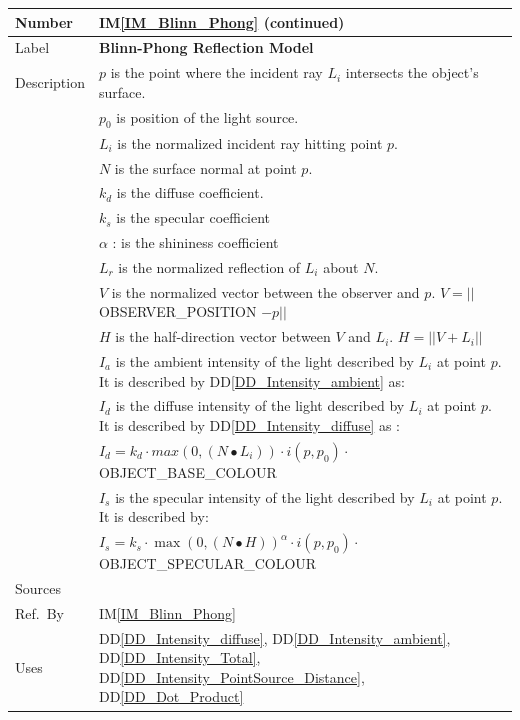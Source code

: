 \documentclass[12pt]{article}
\newcommand{\colAwidth}{0.13\textwidth}
\newcommand{\colBwidth}{0.82\textwidth}
\newcommand{\ddref}[1]{DD\ref{#1}}
\newcommand{\iref}[1]{IM\ref{#1}}
\begin{document}
\begin{minipage}{\textwidth}
	\renewcommand*{\arraystretch}{1.5}
	\begin{tabular}{| p{\colAwidth} | p{\colBwidth}|}
		\hline
		\rowcolor[gray]{0.9}
		Number& \iref{IM_Blinn_Phong} (continued)\\
		\hline
		Label& \bf Blinn-Phong Reflection Model\\
		\hline
		Description & $p$ is the point where the incident ray $L_{i}$ 
		intersects the 	object's surface.\\
		& $p_{0}$ is position of the light source. \\				
		& $L_{i}$ is the normalized incident ray hitting point $p$.\\
		& $N$ is the surface normal at point $p$.\\
		& $k_{d}$ is the diffuse coefficient.\\
		& $k_{s}$ is the specular coefficient\\
		& $\alpha$ : is the shininess coefficient\\		
		& $L_{r}$ is the normalized reflection of $L_{i}$ about $N$.\\
		& $V$ is the normalized vector between the observer and $p$. $V = 
		||$OBSERVER\_POSITION $- p||$\\
		& $H$ is the half-direction vector between $V$ and $L_{i}$. $H = 
		||V+L_{i}||$\\		
		& $I_{a}$ is the ambient intensity of the light described by 
		$L_{i}$ at point $p$. It is described by 
		\ddref{DD_Intensity_ambient} as:\\
		& $I_{d}$ is the diffuse intensity of the light described by 
		$L_{i}$ at point $p$. It is described by 
		\ddref{DD_Intensity_diffuse} as : \\
		& $I_{d} = k_{d}\cdot max(0, (N \bullet 
		L_{i}))\cdot i(p,p_{0})\cdot$ OBJECT\_BASE\_COLOUR \\
		& $I_{s}$ is the specular intensity of the light described by 
		$L_{i}$ at point $p$. It is described by: \\
		& $I_{s} = k_{s} \cdot \max(0, (N \bullet H))^\alpha \cdot
		i(p,p_{0}) \cdot$ OBJECT\_SPECULAR\_COLOUR \\
		\hline
		Sources& \cite{Comninos2005,Lengyel2003,shreiner2012} \\
		\hline
		Ref.\ By & \iref{IM_Blinn_Phong}\\
		\hline
		Uses & \ddref{DD_Intensity_diffuse}, 
		\ddref{DD_Intensity_ambient}, \ddref{DD_Intensity_Total}, 
		\ddref{DD_Intensity_PointSource_Distance}, \ddref{DD_Dot_Product} \\
		\hline
	\end{tabular}
\end{minipage}\\
\end{document}
